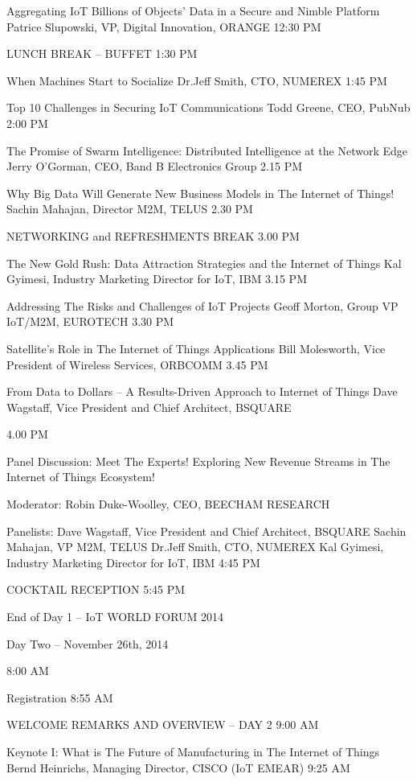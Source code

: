 \documentclass{report}
\begin{document}
Aggregating IoT Billions of Objects’ Data in a Secure and Nimble Platform 
Patrice Slupowski, VP, Digital Innovation, ORANGE
12:30 PM
	
LUNCH BREAK – BUFFET
1:30 PM
	
When Machines Start to Socialize
Dr.Jeff Smith, CTO, NUMEREX
1:45 PM
	
Top 10 Challenges in Securing IoT Communications
Todd Greene, CEO, PubNub
2:00 PM
	
The Promise of Swarm Intelligence:  Distributed Intelligence at the Network Edge
Jerry O’Gorman, CEO, Band B Electronics Group
2.15 PM
	
Why Big Data Will Generate New Business Models in The Internet of Things!
Sachin Mahajan, Director M2M, TELUS
2.30 PM
	
NETWORKING and  REFRESHMENTS BREAK
3.00 PM
	
The New Gold Rush: Data Attraction Strategies and the Internet of Things
Kal Gyimesi, Industry Marketing Director for IoT, IBM
3.15 PM
	
Addressing The Risks and  Challenges of IoT Projects
Geoff Morton, Group VP IoT/M2M, EUROTECH
3.30 PM
	
Satellite’s Role in The Internet of Things Applications
Bill Molesworth, Vice President of Wireless Services, ORBCOMM
3.45 PM
	
From Data to Dollars – A Results-Driven Approach to Internet of Things
Dave Wagstaff, Vice President and Chief Architect, BSQUARE
 
4.00 PM
	
Panel Discussion: Meet The Experts! Exploring New Revenue Streams in The Internet of Things Ecosystem!
 
Moderator:
Robin Duke-Woolley, CEO, BEECHAM RESEARCH
 
Panelists:
Dave Wagstaff, Vice President and Chief Architect, BSQUARE
Sachin Mahajan, VP M2M, TELUS
Dr.Jeff Smith, CTO, NUMEREX
Kal Gyimesi, Industry Marketing Director for IoT, IBM
4:45 PM
	
COCKTAIL RECEPTION
5:45 PM
	
End of Day 1 – IoT WORLD FORUM 2014
 
Day Two – November 26th, 2014
 
8:00 AM
	
Registration
8:55 AM
	
WELCOME REMARKS AND OVERVIEW – DAY 2
9:00 AM
	
Keynote I: What is The Future of Manufacturing in The Internet of Things
Bernd Heinrichs, Managing Director, CISCO (IoT EMEAR)
9:25 AM
	
\end{document}
